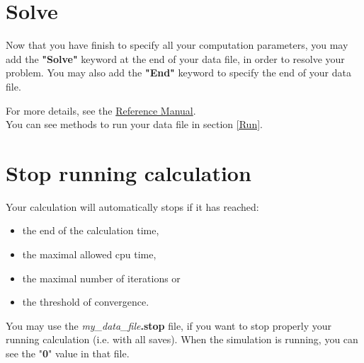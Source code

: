 \section{Solve}
Now that you have finish to specify all your computation parameters, you may add the \textbf{"Solve"} keyword at the end of your data file, in order to resolve your problem.
You may also add the \textbf{"End"} keyword to specify the end of your data file.

    \begin{center}
    \end{center}

For more details, see the \href{TRUST_Reference_Manual.pdf\#solve}{\trust Reference Manual}. \\

You can see methods to run your data file in section \ref{Run}.



\section{Stop running calculation} \label{stopfile}
Your calculation will automatically stops if it has reached:
\begin{itemize}
\item the end of the calculation time,
\item the maximal allowed cpu time,
\item the maximal number of iterations or
\item the threshold of convergence.
\end{itemize}

You may use the \textit{my\_data\_file}\textbf{.stop} file, if you want to stop properly your running calculation (i.e. with all saves).
When the simulation is running, you can see the "\textbf{0}" value in that file.\\

